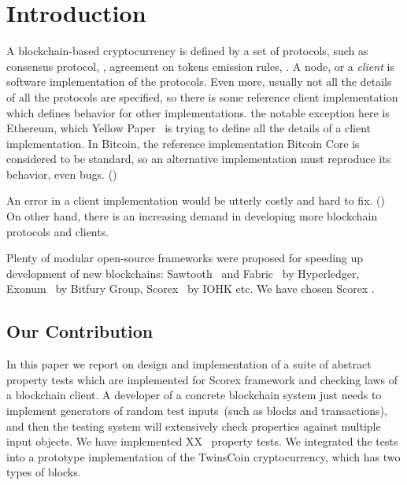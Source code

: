 
\section{Introduction}

A blockchain-based cryptocurrency is defined by a set of protocols, such as consensus protocol, , agreement on tokens emission rules, . A node, or a {\em client} is software implementation of the protocols. Even more, usually not all the details of all the protocols are specified, so there is some reference client implementation which defines behavior for other implementations. the notable exception here is Ethereum, which Yellow Paper~\cite{ethyp} is trying to define all the details of a client implementation. In Bitcoin, the reference implementation Bitcoin Core is considered to be standard, so an alternative implementation must reproduce its behavior, even bugs. ()

An error in a client implementation would be utterly costly and hard to fix. () On other hand, there is an increasing demand in developing more blockchain protocols and clients. 

Plenty of modular open-source frameworks were proposed for speeding up development of new blockchains: Sawtooth~\cite{sawtooth} and Fabric~\cite{fabric} by Hyperledger, Exonum~\cite{exonum} by Bitfury Group, Scorex~\cite{scorex} by IOHK etc. We have chosen Scorex .


\subsection{Our Contribution}

In this paper we report on design and implementation of a suite of abstract property tests which are implemented for Scorex framework and checking laws of a blockchain client. A developer of a concrete blockchain system just needs to implement generators of random test inputs~(such as blocks and transactions), and then the testing system will extensively check properties against multiple input objects. We have implemented XX~ property tests. We integrated the tests into a prototype implementation of the TwinsCoin cryptocurrency, which has two types of blocks.  
